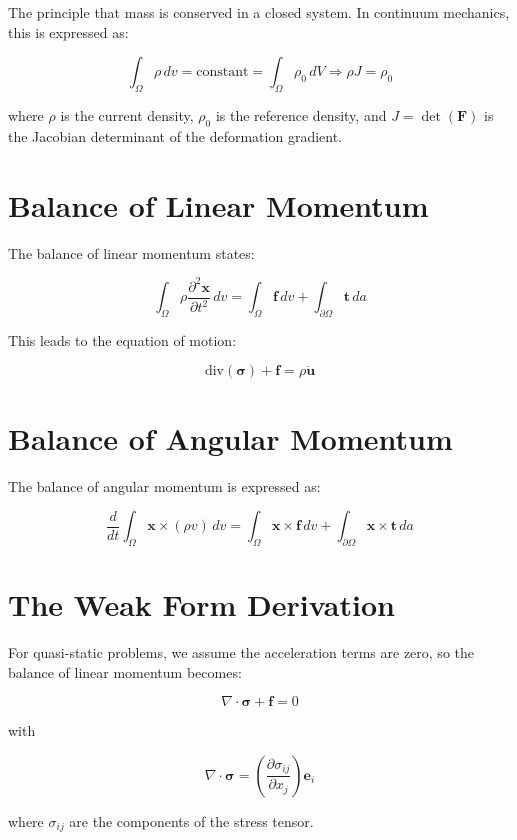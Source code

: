 \documentclass[
  11pt,
  a4paper,
]{scrbook}
\begin{document}
The principle that mass is conserved in a closed system. In continuum
mechanics, this is expressed as:

\[\int_{\Omega} \rho \, dv = \text{constant}= \int_{\Omega} \rho_0 \, dV\Rightarrow \rho J = \rho_0\]

where \(\rho\) is the current density, \(\rho_0\) is the reference
density, and \(J = \det(\mathbf{F})\) is the Jacobian determinant of the
deformation gradient.

\section{Balance of Linear Momentum}\label{balance-of-linear-momentum}

The balance of linear momentum states:

\[\int_{\Omega} \rho \frac{\partial^2 \mathbf{x}}{\partial t^2} \, dv = \int_{\Omega} \mathbf{f} \,dv +\int_{\partial \Omega} \mathbf{t} \, da\]

This leads to the equation of motion:

\[\text{div}(\boldsymbol{\sigma}) + \mathbf{f} = \rho \ddot{\mathbf{u}}\]

\section{Balance of Angular Momentum}\label{balance-of-angular-momentum}

The balance of angular momentum is expressed as:

\[\frac{d}{dt}\int_{\Omega} \mathbf{x} \times (\rho v)\, dv = \int_{\Omega} \mathbf{x} \times \mathbf{f} \,dv +\int_{\partial \Omega} \mathbf{x} \times \mathbf{t} \, da\]

\section{The Weak Form Derivation}\label{the-weak-form-derivation}

For quasi-static problems, we assume the acceleration terms are zero, so
the balance of linear momentum becomes:

\[\nabla \cdot \boldsymbol{\sigma} + \mathbf{f} = 0\]

with

\[\nabla \cdot \boldsymbol{\sigma} = \left(\frac{\partial \sigma_{ij}}{\partial x_j}\right)\mathbf{e}_i\]

where \(\sigma_{ij}\) are the components of the stress tensor.
\end{document}
